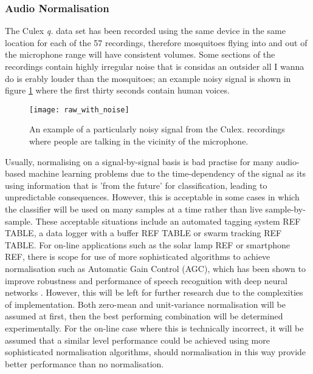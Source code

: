         \subsubsection{Audio Normalisation}
        \label{subsubsec:exp-clf-ass-aud}
            The Culex \textit{q.} data set has been recorded using the same device in the same location for each of the 57 recordings, therefore mosquitoes flying into and out of the microphone range will have consistent volumes. Some sections of the recordings contain highly irregular noise that is considas an outsider all I wanna do is erably louder than the mosquitoes; an example noisy signal is shown in figure \ref{fig:exp-clf-audio-noisy} where the first thirty seconds contain human voices.
            \begin{figure}[ht]
                \centering
                \texttt{[image: raw\_with\_noise]}
                \caption{An example of a particularly noisy signal from the Culex. recordings where people are talking in the vicinity of the microphone.}
                \label{fig:exp-clf-audio-noisy}
            \end{figure}
            Usually, normalising on a signal-by-signal basis is bad practise for many audio-based machine learning problems due to the time-dependency of the signal as its using information that is 'from the future' for classification, leading to unpredictable consequences. However, this is acceptable in some cases in which the classifier will be used on many samples at a time rather than live sample-by-sample. These acceptable situations include an automated tagging system REF TABLE, a data logger with a buffer REF TABLE or swarm tracking REF TABLE. 
            For on-line applications such as the solar lamp REF or smartphone REF, there is scope for use of more sophisticated algorithms to achieve normalisation such as Automatic Gain Control (AGC), which has been shown to improve robustness and performance of speech recognition with deep neural networks \cite{Prabhavalkar2015}. However, this will be left for further research due to the complexities of implementation. Both zero-mean and unit-variance normalisation will be assumed at first, then the best performing combination will be determined experimentally. For the on-line case where this is technically incorrect, it will be assumed that a similar level performance could be achieved using more sophisticated normalisation algorithms, should normalisation in this way provide better performance than no normalisation. 

